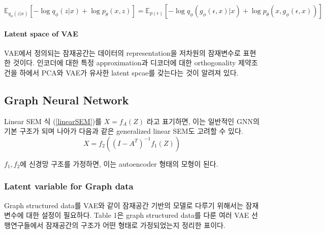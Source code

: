 \documentclass[10pt]{article}
\begin{document}
\begin{equation}
\mathbb{E}_{q_{\phi}(z|x)}[- \log{q_{\phi}(z|x)} + \log{p_{\theta}(x,z)}] = \mathbb{E}_{p(\epsilon)}[- \log{q_{\phi}(g_{\phi}(\epsilon, x)|x)} + \log{p_{\theta}(x,g_{\phi}(\epsilon, x))}]
\label{reparametrization}
\end{equation}

\paragraph*{Latent space of VAE}

VAE에서 정의되는 잠재공간는 데이터의 representation을 저차원의 잠재변수로 표현한 것이다. 인코더에 대한 특정 approximation과 디코더에 대한 orthogonality 제약조건을 하에서 PCA와 VAE가 유사한 latent spcae를 갖는다는 것이 알려져 있다. \cite{rolinek2019variational} 

\subsection{Graph Neural Network}

Linear SEM 식 (\ref*{linearSEM})를 $X=f_A(Z)$ 라고 표기하면, 이는 일반적인 GNN의 기본 구조가 되며 나아가 다음과 같은 generalized linear SEM도 고려할 수 있다. \cite{yu2019daggnn} 
\begin{equation}
    X = f_2((I-A^T)^{-1}f_1(Z))
    \label{gSEM}
\end{equation}

$f_1,f_2$에 신경망 구조를 가정하면, 이는 autoencoder 형태의 모형이 된다.

\subsubsection*{Latent variable for Graph data}

Graph structured data를 VAE와 같이 잠재공간 기반의 모델로 다루기 위해서는 잠재변수에 대한 설정이 필요하다. Table 1은 graph structured data를 다룬 여러 VAE 선행연구들에서 잠재공간의 구조가 어떤 형태로 가정되었는지 정리한 표이다.

\end{document}
